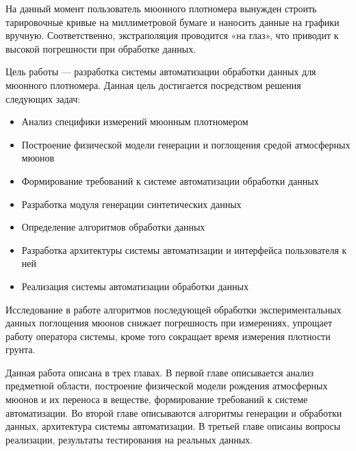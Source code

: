На данный момент пользователь мюонного плотномера вынужден строить тарировочные кривые на миллиметровой бумаге 
и наносить данные на графики вручную. Соответственно, экстраполяция проводится «на глаз», что приводит к высокой 
погрешности при обработке данных.


Цель работы --- разработка системы автоматизации обработки данных для мюонного плотномера. 
Данная цель достигается посредством решения следующих задач:

\begin{itemize}
 \item Анализ специфики измерений мюонным плотномером 
 \item Построение физической модели генерации и поглощения средой атмосферных мюонов
 \item Формирование требований к системе автоматизации обработки данных
 \item Разработка модуля генерации синтетических данных 
 \item Определение алгоритмов обработки данных 
 \item Разработка архитектуры системы автоматизации и интерфейса пользователя к ней
 \item Реализация системы автоматизации обработки данных
\end{itemize}


Исследование в работе алгоритмов последующей обработки экспериментальных данных поглощения мюонов
снижает погрешность при измерениях, упрощает работу оператора системы, кроме того 
сокращает время измерения плотности грунта.


Данная работа описана в трех главах. В первой главе описывается анализ предметной области, построение физической 
модели рождения атмосферных мюонов и их переноса в веществе, формирование требований к системе автоматизации. Во второй главе
описываются алгоритмы генерации и обработки данных, архитектура системы автоматизации. В третьей главе описаны вопросы реализации, 
результаты тестирования на реальных данных.

\clearpage